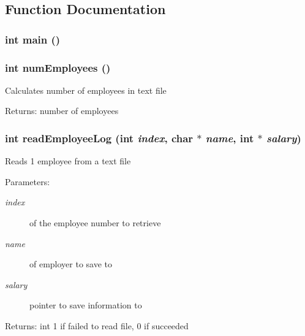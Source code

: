 \subsection{Function Documentation}
\subsubsection{\setlength{\rightskip}{0pt plus 5cm}int main ()}\label{part5_8c_e66f6b31b5ad750f1fe042a706a4e3d4}


\subsubsection{\setlength{\rightskip}{0pt plus 5cm}int num\-Employees ()}\label{part5_8c_801748b5d2d028f0482ce56bb43d331c}


Calculates number of employees in text file \begin{Desc}
\item[Returns:]number of employees \end{Desc}
\subsubsection{\setlength{\rightskip}{0pt plus 5cm}int read\-Employee\-Log (int {\em index}, char $\ast$ {\em name}, int $\ast$ {\em salary})}\label{part5_8c_6eba06bb925710329353f8f4bcfa3192}


Reads 1 employee from a text file \begin{Desc}
\item[Parameters:]
\begin{description}
\item[{\em index}]of the employee number to retrieve \item[{\em name}]of employer to save to \item[{\em salary}]pointer to save information to \end{description}
\end{Desc}
\begin{Desc}
\item[Returns:]int 1 if failed to read file, 0 if succeeded \end{Desc}
